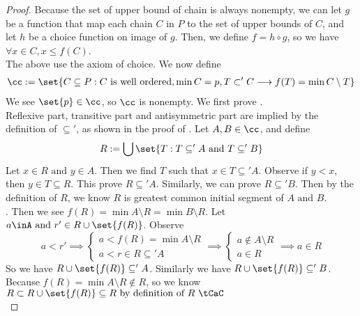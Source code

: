\documentclass{report}
\begin{document}
\begin{proof}
Because the set of upper bound of chain is always nonempty, we can let $g$ be a function that map each chain $C$ in  $P$ to the set of upper bounds of $C$, and let $h$ be a choice function on image of $g$. Then, we define $f=h\circ g$, so we have  $\forall x \in C, x\leq f(C)$.\\

The above use the axiom of choice. We now define 
\begin{multline}
\cc:=\set{C\subseteq P: C\text{ is well ordered},\min C=p,T\subset' C\longrightarrow f(T)=\min C\setminus T}
\end{multline}
We see $\set{p}\in \cc$, so $\cc$ is nonempty. We first prove .\\

Reflexive part, transitive part and antisymmetric part are implied by the definition of $\subseteq'$, as shown in the proof of . Let $A,B \in \cc$, and define
\begin{equation*}
R:=\bigcup \set{T: T \subseteq' A\text{ and }T\subseteq' B}
\end{equation*}
Let $x\in R\text{ and }y \in A$. Then we find $T$ such that $x \in T\subseteq' A$. Observe if $y<x$, then $y\in T \subseteq R$. This prove $R\subseteq' A$. Similarly, we can prove $R\subseteq' B$. Then by the definition of $R$, we know  $R$ is greatest common initial segment of  $A\text{ and }B$.\\

. Then we see $f(R)=\min A\setminus R=\min B\setminus R$. Let $a\inA\text{ and }r'\in R\cup \set{f(R)}$. Observe
\begin{equation*}
a<r' \implies \begin{cases}
  a<f(R)=\min A\setminus R\\
  a<r \in R\subseteq' A
\end{cases}\implies \begin{cases}
  a \not\in A\setminus R\\
  a \in R
\end{cases}\implies a\in R
\end{equation*}
So we have $R\cup \set{f(R)}\subseteq' A$. Similarly we have $R\cup \set{f(R)}\subseteq' B$. Because $f(R)=\min A\setminus R\not\in R$, so we know $R\subset R\cup \set{f(R)}\subseteq R\text{ by definition of $R$ }\tCaC$\\


\end{proof}
\end{document}
